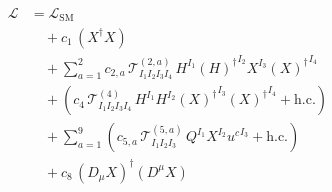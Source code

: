 \documentclass{article}
\begin{document}
\begin{align*}\mathcal{L} &= \mathcal{L}_{\mathrm{SM}}\\ &\quad + c_{1}\,\left(X^{\dagger} X\right)\\ &\quad + \sum_{a=1}^{2} c_{2,a}\,\mathcal{T}^{(2,a)}_{I_{1} I_{2} I_{3} I_{4}}\,{H}^{I_{1}} {(H)^{\dagger}}^{I_{2}} {X}^{I_{3}} {(X)^{\dagger}}^{I_{4}}\\ &\quad + \left(c_{4}\,\mathcal{T}^{(4)}_{I_{1} I_{2} I_{3} I_{4}}\,{H}^{I_{1}} {H}^{I_{2}} {(X)^{\dagger}}^{I_{3}} {(X)^{\dagger}}^{I_{4}} + \mathrm{h.c.}\right)\\ &\quad + \sum_{a=1}^{9} \left(c_{5,a}\,\mathcal{T}^{(5,a)}_{I_{1} I_{2} I_{3}}\,{Q}^{I_{1}} {X}^{I_{2}} {u^c}^{I_{3}} + \mathrm{h.c.}\right)\\ &\quad + c_{8}\,\left(D_{\mu} X\right)^{\dagger}\left(D^{\mu} X\right)\end{align*}
\end{document}
